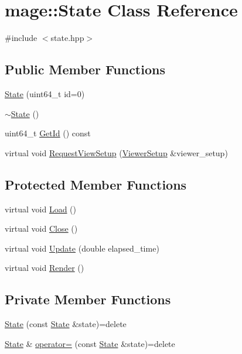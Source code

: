 \hypertarget{classmage_1_1_state}{}\section{mage\+:\+:State Class Reference}
\label{classmage_1_1_state}


{\ttfamily \#include $<$state.\+hpp$>$}

\subsection*{Public Member Functions}
\begin{DoxyCompactItemize}
\item 
\hyperlink{classmage_1_1_state_ac21bb6de22bb3b9c1b18d98b53e92100}{State} (uint64\+\_\+t id=0)
\item 
\hyperlink{classmage_1_1_state_aa970b0dd628870e72a7f7fffcff1db13}{$\sim$\+State} ()
\item 
uint64\+\_\+t \hyperlink{classmage_1_1_state_a07c383a809204ba12a2bbfb22d2977d5}{Get\+Id} () const
\item 
virtual void \hyperlink{classmage_1_1_state_a22274e1bc87f6b8883cddfb05e35f120}{Request\+View\+Setup} (\hyperlink{structmage_1_1_viewer_setup}{Viewer\+Setup} \&viewer\+\_\+setup)
\end{DoxyCompactItemize}
\subsection*{Protected Member Functions}
\begin{DoxyCompactItemize}
\item 
virtual void \hyperlink{classmage_1_1_state_aa88ace504c82ad372e5e599746f3ebda}{Load} ()
\item 
virtual void \hyperlink{classmage_1_1_state_a1edd5d756566f5b689c7a381f4e6b301}{Close} ()
\item 
virtual void \hyperlink{classmage_1_1_state_afbee8caa84e0c69ac5757f7e5e87317f}{Update} (double elapsed\+\_\+time)
\item 
virtual void \hyperlink{classmage_1_1_state_a6e3b3f55bfd5be86a02783a2f76c9709}{Render} ()
\end{DoxyCompactItemize}
\subsection*{Private Member Functions}
\begin{DoxyCompactItemize}
\item 
\hyperlink{classmage_1_1_state_a4515dcef9830ce6522ea6036465dcff7}{State} (const \hyperlink{classmage_1_1_state}{State} \&state)=delete
\item 
\hyperlink{classmage_1_1_state}{State} \& \hyperlink{classmage_1_1_state_a84466f5058f3e27b85a3b164e551008c}{operator=} (const \hyperlink{classmage_1_1_state}{State} \&state)=delete
\end{DoxyCompactItemize}
